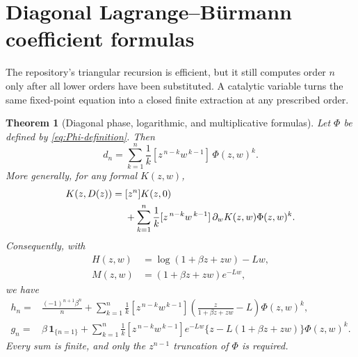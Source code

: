 \documentclass[11pt,oneside]{article}
\numberwithin{equation}{section}
\newtheorem{theorem}{Theorem}[section]
\theoremstyle{definition}
\theoremstyle{remark}
\newcommand{\ind}{\mathbf 1}
\begin{document}
\section{Diagonal Lagrange--Bürmann coefficient formulas}
\label{sec:diagonal}

The repository's triangular recursion is efficient, but it still computes order $n$ only after all lower orders have been substituted.  A catalytic variable turns the same fixed-point equation into a closed finite extraction at any prescribed order.

\begin{theorem}[Diagonal phase, logarithmic, and multiplicative formulas]
\label{thm:diagonal-formulas}
Let $\Phi$ be defined by \cref{eq:Phi-definition}.  Then
\begin{equation}
 \boxed{
 d_n=\sum_{k=1}^{n}\frac1k
 [z^{\,n-k}w^{\,k-1}]\,\Phi(z,w)^k.}
 \label{eq:diagonal-dn}
\end{equation}
More generally, for any formal $K(z,w)$,
\begin{align}
 [z^n]K(z,D(z))={}&[z^n]K(z,0)
 \notag\\
 &+\sum_{k=1}^{n}\frac1k
 [z^{\,n-k}w^{\,k-1}]\,
 \partial_wK(z,w)\Phi(z,w)^k.
 \label{eq:general-composition}
\end{align}
Consequently, with
\begin{align}
 H(z,w)&=\log(1+\beta z+zw)-Lw,
 \label{eq:Hzw}\\
 M(z,w)&=(1+\beta z+zw)e^{-Lw},
 \label{eq:Mzw}
\end{align}
we have
\begin{align}
 h_n={}&\frac{(-1)^{n+1}\beta^n}{n}
 +\sum_{k=1}^{n}\frac1k[z^{\,n-k}w^{\,k-1}]
 \left(\frac{z}{1+\beta z+zw}-L\right)\Phi(z,w)^k,
 \label{eq:diagonal-hn}\\
 g_n={}&\beta\,\ind_{\{n=1\}}
 +\sum_{k=1}^{n}\frac1k[z^{\,n-k}w^{\,k-1}]
 e^{-Lw}\{z-L(1+\beta z+zw)\}\Phi(z,w)^k.
 \label{eq:diagonal-gn}
\end{align}
Every sum is finite, and only the $z^{n-1}$ truncation of $\Phi$ is required.
\end{theorem}
\end{document}
